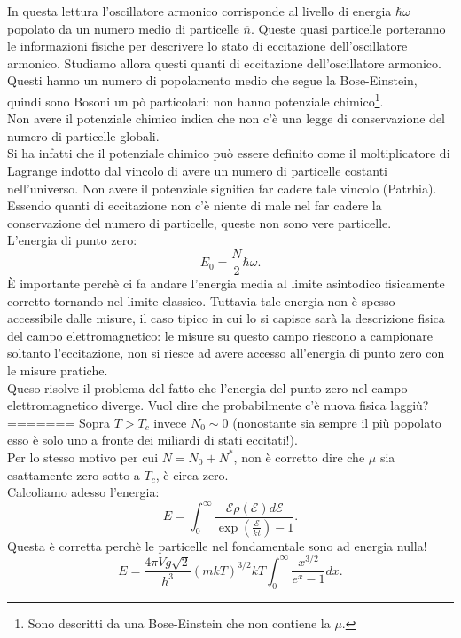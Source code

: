 In questa lettura l'oscillatore armonico corrisponde al livello di energia $\hbar\omega $ popolato da un numero medio di particelle $\overline{n}$. Queste quasi particelle porteranno le informazioni fisiche per descrivere lo stato di eccitazione dell'oscillatore armonico. Studiamo allora questi quanti di eccitazione dell'oscillatore armonico.\\
Questi hanno un numero di popolamento medio che segue la Bose-Einstein, quindi sono Bosoni un pò particolari: non hanno potenziale chimico\footnote{Sono descritti da una Bose-Einstein che non contiene la $\mu $.}.\\
Non avere il potenziale chimico indica che non c'è una legge di conservazione del numero di particelle globali.\\
Si ha infatti che il potenziale chimico può essere definito come il moltiplicatore di Lagrange indotto dal vincolo di avere un numero di particelle costanti nell'universo. Non avere il potenziale significa far cadere tale vincolo (Patrhia).\\ 
Essendo quanti di eccitazione non c'è niente di male nel far cadere la conservazione del numero di particelle, queste non sono vere particelle.\\
L'energia di punto zero:
\[
	E_0 = \frac{N}{2}\hbar\omega 
.\] 
È importante perchè ci fa andare l'energia media al limite asintodico fisicamente corretto tornando nel limite classico. 
Tuttavia tale energia non è spesso accessibile dalle misure, il caso tipico in cui lo si capisce sarà la descrizione fisica del campo elettromagnetico: le misure su questo campo riescono a campionare soltanto l'eccitazione, non si riesce ad avere accesso all'energia di punto zero con le misure pratiche.\\
Queso risolve il problema del fatto che l'energia del punto zero nel campo elettromagnetico diverge. Vuol dire che probabilmente c'è nuova fisica laggiù?
=======
Sopra $T>T_{c}$ invece $N_0 \sim 0$ (nonostante sia sempre il più popolato esso è solo uno a fronte dei miliardi di stati eccitati!).\\
Per lo stesso motivo per cui $N = N_0 + N^{*}$, non è corretto dire che $\mu $ sia esattamente zero sotto a $T_{c}$, è circa zero.\\
Calcoliamo adesso l'energia:
\[
	E = \int_{0}^{\infty} \frac{\mathcal{E} \rho ( \mathcal{E} ) d\mathcal{E} }{\exp\left( \frac{\mathcal{E} }{kt} \right) -1} 
.\] 
Questa è corretta perchè le particelle nel fondamentale sono ad energia nulla! 
\[
	E = \frac{4\pi V g \sqrt{2} }{h^3}\left( m k T \right) ^{3 /2} kT \int_{0}^{\infty} \frac{x^{3 /2}}{e^{x}-1}dx  
.\] 
